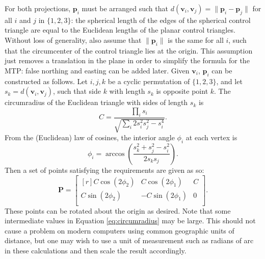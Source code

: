 \documentclass[]{interact}
\begin{document}
For both projections, $\mathbf p_i$ must be arranged such that
$d\left(\mathbf v_i, \mathbf v_j\right) = \|\mathbf p_i - \mathbf p_j\|$
for all $i$ and $j$ in $\{1, 2, 3\}$: the spherical length of the edges of the
spherical control triangle are equal to the Euclidean lengths of the planar
control triangles. Without loss of generality, also assume that
$\|\mathbf p_i\|$ is the same for all $i$, such that the circumcenter of the
control triangle lies at the origin. This assumption just removes a translation
in the plane in order to simplify the formula for the MTP: false northing and
easting can be added later. Given $\mathbf v_i$, $\mathbf p_i$ can be
constructed as follows. Let $i, j, k$ be a cyclic permutation of
$\{1, 2, 3\}$, and let $s_k = d\left(\mathbf v_i, \mathbf v_j\right)$,
such that side $k$ with length $s_k$ is opposite point $k$. The circumradius
of the Euclidean triangle with sides of length $s_k$ is \citep{isaacs}
\begin{equation}\label{eq:circumradius}
  C = \frac{\prod_i s_i}
            {\sqrt{\sum_i 2 s_i^2 s_j^2 - s_i^4}}.
\end{equation}
From the (Euclidean) law of cosines,
the interior angle $\phi_i$ at each vertex is
\begin{equation}\label{eq:phi}
  \phi_i = \arccos \left( \frac{s_k^2 + s_j^2 - s_i^2}{2 s_k s_j}\right).
\end{equation}
Then a set of points satisfying the requirements are given as so:
\begin{equation}\label{eq:planarctrlpts}
  \mathbf P = \begin{bmatrix*}[r]
  C \cos \left(2 \phi_2 \right) &
  C \cos \left(2 \phi_1 \right) &
  C \\
  C \sin \left(2 \phi_2 \right) &
  -C \sin \left(2 \phi_1 \right) &
  0 \\
\end{bmatrix*}.
\end{equation}
These points can be rotated about the origin as desired. Note that some
intermediate values in Equation \ref{eq:circumradius} may be large. This
should not cause a problem on modern computers using common geographic
units of distance, but one may wish to use a unit of measurement such
as radians of arc in these calculations and then scale the result accordingly.
\end{document}
